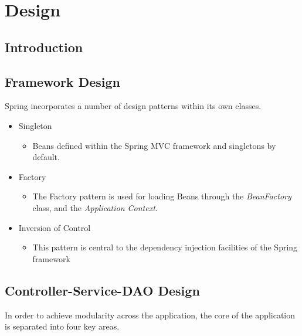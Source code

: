 \chapter{Design}
\label{design}

\section{Introduction}

\section{Framework Design}

Spring incorporates a number of design patterns within its own classes. 

\begin{table}[H]
\begin{itemize}
\item Singleton
\begin{itemize}
\item Beans defined within the Spring MVC framework and singletons by default. 
\end{itemize}
\item Factory
\begin{itemize}
\item The Factory pattern is used for loading Beans through the \textit{BeanFactory} class, and the \textit{Application Context}. 
\end{itemize}
\item Inversion of Control
\begin{itemize}
\item This pattern is central to the dependency injection facilities of the Spring framework
\end{itemize}
\end{itemize}
\label{fig:springdesignpatterns}
\end{table}

\label{sec:design}
\section{Controller-Service-DAO Design}

In order to achieve modularity across the application, the core of the application is separated into four key areas.

